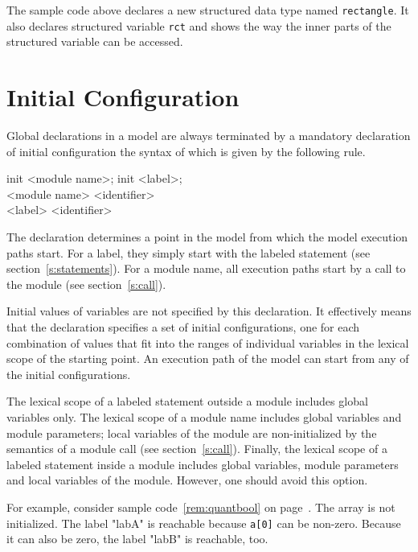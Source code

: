 \documentclass[a4paper,11pt,titlepage,english]{article}
\begin{document}
The sample code above declares a new structured data type named
\verb|rectangle|. It also declares structured variable \verb|rct| and shows
the way the inner parts of the structured variable can be accessed.


\section{Initial Configuration\label{s:init}}

Global declarations in a model are always terminated by a mandatory
declaration of initial configuration the syntax of which is given by the
following rule.
\begin{bnfgrammar}
     \is init <module name>; \or init <label>; \\
<module name>   \is <identifier> \\
<label>         \is <identifier> \\
\end{bnfgrammar}

The declaration determines a point in the model from which the model
execution paths start. For a label, they simply start with the labeled
statement (see section~\ref{s:statements}). For a module name, all
execution paths start by a call to the module (see section~\ref{s:call}).

Initial values of variables are not specified by this declaration. It
effectively means that the declaration specifies a set of initial
configurations, one for each combination of values that fit into the ranges
of individual variables in the lexical scope of the starting point.  An
execution path of the model can start from any of the initial
configurations.

The lexical scope of a labeled statement outside a module includes global
variables only. The lexical scope of a module name includes global
variables and module parameters; local variables of the module are
non-initialized by the semantics of a module call (see
section~\ref{s:call}). Finally, the lexical scope of a labeled statement
inside a module includes global variables, module parameters and local
variables of the module. However, one should avoid this option.

For example, consider sample code~\ref{rem:quantbool} on
page~\pageref{rem:quantbool}. The array is not initialized. The label
"labA" is reachable because \verb|a[0]| can be non-zero. Because it can also be
zero, the label "labB" is reachable, too.
\end{document}
